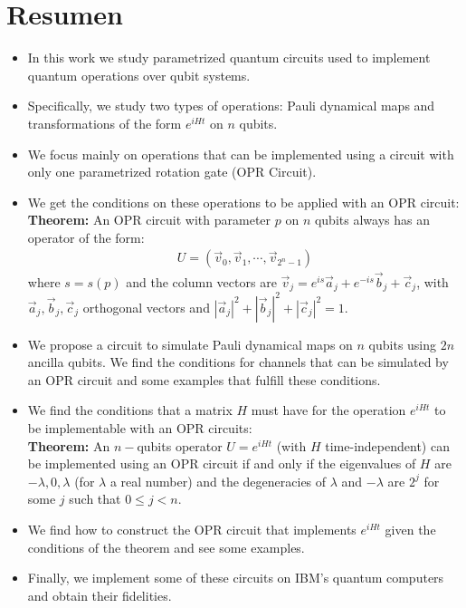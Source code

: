 \section{Resumen}
\begin{itemize}
\item In this work we study parametrized quantum circuits used to implement
quantum operations over qubit systems. 
\item Specifically, we study two types of operations: Pauli
dynamical maps and transformations of the form $e^{iHt}$ on $n$ qubits. 
\item We focus mainly on operations that can be implemented using a circuit 
with only one parametrized rotation gate (OPR Circuit). 
\item We get the conditions on these operations to be
applied with an OPR circuit:\\

\textbf{Theorem:} An OPR circuit with parameter $p$ on $n$ qubits always has an operator of the form:
\begin{eqnarray}
U  = (\vec{v}_0, \vec{v}_1, \cdots, \vec{v}_{2^n-1})
\end{eqnarray}
where $s = s(p)$ and the column vectors are $\vec{v}_j = e^{is} \vec{a}_j + e^{-is} \vec{b}_j + \vec{c}_j$, with $\vec{a}_j, \vec{b}_j, \vec{c}_j$ orthogonal vectors and $|\vec{a}_j|^2 + |\vec{b}_j|^2 + |\vec{c}_j|^2 = 1$. \\

\item We propose a circuit to simulate Pauli dynamical maps on $n$ qubits using $2n$ ancilla qubits. We find the conditions for channels that can be simulated by an OPR circuit and some examples that fulfill these conditions. 

\item We find the conditions that a matrix $H$ must have for the operation $e^{iHt}$ to be implementable with an OPR circuits: \\

 \textbf{Theorem:} An $n-$qubits operator $U = e^{iHt}$ (with $H$ time-independent) can be implemented using an OPR circuit if and only if the eigenvalues of $H$ are $-\lambda, 0, \lambda$ (for $\lambda$ a real number) and the degeneracies of $\lambda$ and $-\lambda$ are $2^j$ for some $j$ such that $0 \leq j <n$.
\item We find how to construct the OPR circuit that implements $e^{iHt}$ given the conditions of the theorem and see some examples. 

\item Finally, we implement some of these
circuits on IBM's quantum computers and obtain their fidelities.
\end{itemize}
\newpage


